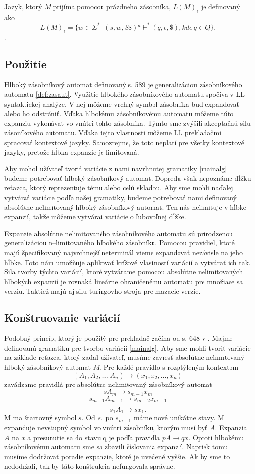 Jazyk, ktorý $M$ prijíma pomocou prázdneho zásobníka, $L(M)_\epsilon$ je definovaný ako $$L(M)_\epsilon = \{w \in \Sigma^* \,| \, (s, w, S\$) {}^a\vdash^* (q, \epsilon, \$), kde \, q \in Q\}.$$.

\subsection{Použitie}
Hlboký zásobníkový automat definovaný s. 589 \cite{FITPUB10498} je generalizáciou zásobníkového automatu \ref{def:zasaut}. Využitie hlbokého zásobníkového automatu spočíva v LL syntaktickej analýze. V nej môžeme vrchný symbol zásobníka buď expandovať alebo ho odstrániť. Vďaka hlbokému zásobníkovému automatu môžeme túto expanziu vykonávať vo vnútri tohto zásobníka. Týmto sme zvýšili akceptačnú silu zásoníkového automatu. Vďaka tejto vlastnosti môžeme LL prekladačmi spracovať kontextové jazyky. Samozrejme, že toto neplatí pre všetky kontextové jazyky, pretože hĺbka expanzie je limitovaná.

Aby mohol užívateľ tvoriť variácie z nami navrhnutej gramatiky \ref{mainalg} budeme potrebovať hlboký zásobníkový automat. Dopredu však nepoznáme dĺžku reťazca, ktorý reprezentuje tému alebo celú skladbu. Aby sme mohli naďalej vytvárať variácie podľa našej gramatiky, budeme potrebovať nami definovaný absolútne nelimitovaný hlboký zásobníkový automat. Ten nás nelimituje v hĺbke expanzií, takže môžeme vytvárať variácie o ľubovoľnej dĺžke.

Expanzie absolútne nelimitovaného zásobníkového automatu sú prirodzenou generalizáciou n--limitovaného hlbokého zásobníku. Pomocou pravidiel, ktoré majú špecifikovaný najvrchnejší neterminál vieme expandovať nezávisle na jeho hĺbke. Toto nám umožňuje aplikovať krížové vlastností variácií a vytvárať ich tak. Sila tvorby týchto variácií, ktoré vytvárame pomocou absolútne nelimitovaných hlbokých expanzií je rovnaká lineárne ohraničenému automatu pre množiace sa verziu. Taktiež majú aj silu turingovho stroja pre mazacie verzie.

\subsection{Konštruovanie variácií}
Podobný princíp, ktorý je použitý pre prekladač začína od s. 648 v \cite{FITPUB10498}. Majme definovanú gramatiku pre tvorbu variácií \ref{mainalg}. Aby sme mohli tvoriť variácie na základe reťazca, ktorý zadal užívateľ, musíme zaviesť absolútne nelimitovaný hlboký zásobníkový automat $M$. Pre každé pravidlo s rozptýleným kontextom $$(A_1, A_2, ..., A_n) \rightarrow (x_1, x_2, ..., x_n)$$ zavádzame pravidlá pre absolútne nelimitovaný zásobníkový automat $$sA_m \rightarrow s_{m-1}x_m$$ $$s_{m-1}A_{m-1} \rightarrow s_{m-2}x_{m - 1}$$ $$\vdots$$ $$s_1A_1 \rightarrow sx_1.$$ M ma štartovný symbol $s$. Od $s_1$ po $s_{m - 1}$ máme nové unikátne stavy. M expanduje nevstupný symbol vo vnútri zásobníku, ktorým musí byť $A$. Expanzia $A$ na $x$ a presunutie sa do stavu q je podľa pravidla $pA \rightarrow qx$. Oproti hlbokému zásobníkovému automatu sme sa zbavili číslovania expanzií. Napriek tomu musíme dodržovať poradie expanzie, ktoré je uvedené vyššie. Ak by sme to nedodržali, tak by táto konštrukcia nefungovala správne.


